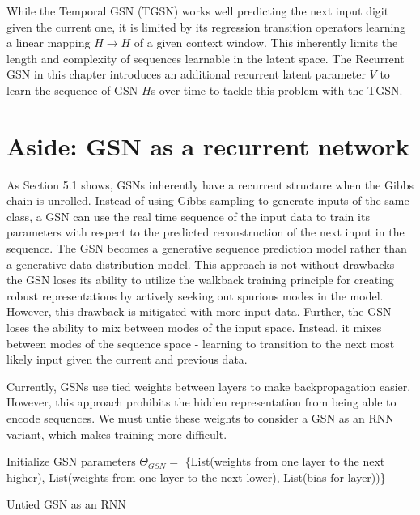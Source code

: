 While the Temporal GSN (TGSN) works well predicting the next input digit given the current one, it is limited by its regression transition operators learning a linear mapping \(H \rightarrow H\) of a given context window. This inherently limits the length and complexity of sequences learnable in the latent space. The Recurrent GSN in this chapter introduces an additional recurrent latent parameter \(V\) to learn the sequence of GSN \(H\)s over time to tackle this problem with the TGSN.

\section{Aside: GSN as a recurrent network}
As Section 5.1 shows, GSNs inherently have a recurrent structure when the Gibbs chain is unrolled. Instead of using Gibbs sampling to generate inputs of the same class, a GSN can use the real time sequence of the input data to train its parameters with respect to the predicted reconstruction of the next input in the sequence. The GSN becomes a generative sequence prediction model rather than a generative data distribution model. This approach is not without drawbacks - the GSN loses its ability to utilize the walkback training principle for creating robust representations by actively seeking out spurious modes in the model. However, this drawback is mitigated with more input data.  Further, the GSN loses the ability to mix between modes of the input space. Instead, it mixes between modes of the sequence space - learning to transition to the next most likely input given the current and previous data.

Currently, GSNs use tied weights between layers to make backpropagation easier. However, this approach prohibits the hidden representation from being able to encode sequences. We must untie these weights to consider a GSN as an RNN variant, which makes training more difficult.

\begin{algorithm}[h!]
	Initialize GSN parameters \(\Theta_{GSN} = \) \{List(weights from one layer to the next higher), List(weights from one layer to the next lower), List(bias for layer))\}\;
	\caption{ Untied GSN as an RNN }
\end{algorithm}


